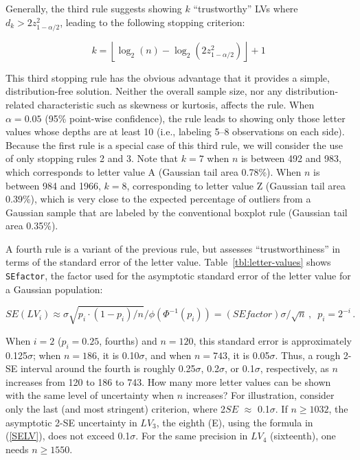 \documentclass[oneside]{article}
\begin{document}
Generally, the third rule suggests showing $k$ ``trustworthy'' LVs where $d_k > 2 z_{1-\alpha/2}^2 $, leading to the following stopping criterion:

\begin{equation}
k =  \left \lfloor \log_2 (n) - \log_2 
   \left(2  z_{1-\alpha/2}^2 \right) \right \rfloor + 1
\end{equation}

\noindent This third stopping rule has the obvious advantage that it provides a simple, distribution-free solution. Neither the overall sample size, nor any distribution-related characteristic such as skewness or kurtosis, affects the rule. When $\alpha = 0.05$ (95\% point-wise confidence), the rule leads to showing only those letter values whose depths are at least 10 (i.e., labeling 5--8 observations on each side). Because the first rule is a special case of this third rule, we will consider the use of only stopping rules 2 and 3. Note that $k = 7$ when $n$ is between 492 and 983, which corresponds to letter value A (Gaussian tail area 0.78\%). When $n$ is between 984 and 1966, $k = 8$, corresponding to letter value Z (Gaussian tail area 0.39\%), which is very close to the expected percentage of outliers from a Gaussian sample that are labeled by the conventional boxplot rule (Gaussian tail area 0.35\%).


A fourth rule is a variant of the previous rule, but assesses ``trustworthiness'' in terms of the standard error of the letter value. Table~\ref{tbl:letter-values} shows \texttt{SEfactor}, the factor used for the asymptotic standard error of the letter value for a Gaussian population:

\begin{equation}
SE(LV_i) \approx \sigma \sqrt{p_i \cdot (1 - p_i)/ n} / \phi(\Phi^{-1}(p_i)) 
 = (SEfactor) \sigma / \sqrt{n} \, ,
 \, \, \, p_i = 2^{-i} \, .
\label{SELV}
\end{equation}

\noindent When $i = 2$ ($p_i = 0.25$, fourths) and $n = 120$, this standard error is approximately 0.125$\sigma$; when $n = 186$, it is 0.10$\sigma$, and when $n = 743$, it is 0.05$\sigma$. Thus, a rough 2-SE interval around the fourth is roughly 0.25$\sigma$, 0.2$\sigma$, or 0.1$\sigma$, respectively, as $n$ increases from 120 to 186 to 743. How many more letter values can be shown with the same level of uncertainty when $n$ increases? For illustration, consider only the last (and most stringent) criterion, where 2$SE$ $\approx$ 0.1$\sigma$. If $n \geq 1032$, the asymptotic 2-SE uncertainty in $LV_3$, the eighth (E), using the formula in (\ref{SELV}), does not exceed 0.1$\sigma$. For the same precision in $LV_4$ (sixteenth), one needs $n \geq 1550$.
\end{document}

